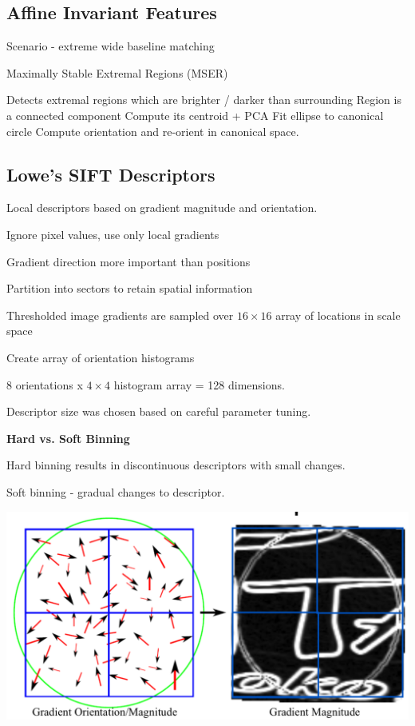 \subsection{Affine Invariant Features}
Scenario - extreme wide baseline matching

Maximally Stable Extremal Regions (MSER)

Detects extremal regions which are brighter / darker than surrounding
Region is a connected component
Compute its centroid + PCA
Fit ellipse to canonical circle
Compute orientation and re-orient in canonical space.

\subsection{Lowe's SIFT Descriptors}

Local descriptors based on gradient magnitude and orientation.

Ignore pixel values, use only local gradients

Gradient direction more important than positions

Partition into sectors to retain spatial information

Thresholded image gradients are sampled over $16\times16$ array of locations in scale space

Create array of orientation histograms

8 orientations x $4\times4$ histogram array = 128 dimensions.

Descriptor size was chosen based on careful parameter tuning. 

\textbf{Hard vs. Soft Binning}

Hard binning results in discontinuous descriptors with small changes.

Soft binning - gradual changes to descriptor.

\includegraphics[width=0.9\columnwidth]{cv_figures/lowe.png}

